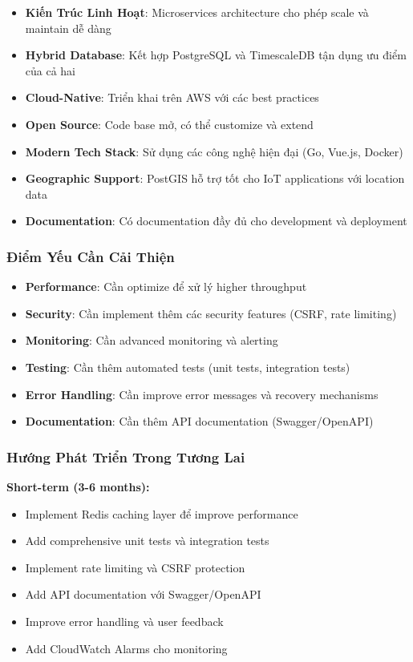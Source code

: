 \begin{itemize}
    \item \textbf{Kiến Trúc Linh Hoạt}: Microservices architecture cho phép scale và maintain dễ dàng
    \item \textbf{Hybrid Database}: Kết hợp PostgreSQL và TimescaleDB tận dụng ưu điểm của cả hai
    \item \textbf{Cloud-Native}: Triển khai trên AWS với các best practices
    \item \textbf{Open Source}: Code base mở, có thể customize và extend
    \item \textbf{Modern Tech Stack}: Sử dụng các công nghệ hiện đại (Go, Vue.js, Docker)
    \item \textbf{Geographic Support}: PostGIS hỗ trợ tốt cho IoT applications với location data
    \item \textbf{Documentation}: Có documentation đầy đủ cho development và deployment
\end{itemize}

\subsubsection{Điểm Yếu Cần Cải Thiện}

\begin{itemize}
    \item \textbf{Performance}: Cần optimize để xử lý higher throughput
    \item \textbf{Security}: Cần implement thêm các security features (CSRF, rate limiting)
    \item \textbf{Monitoring}: Cần advanced monitoring và alerting
    \item \textbf{Testing}: Cần thêm automated tests (unit tests, integration tests)
    \item \textbf{Error Handling}: Cần improve error messages và recovery mechanisms
    \item \textbf{Documentation}: Cần thêm API documentation (Swagger/OpenAPI)
\end{itemize}

\subsubsection{Hướng Phát Triển Trong Tương Lai}

\textbf{Short-term (3-6 months):}
\begin{itemize}
    \item Implement Redis caching layer để improve performance
    \item Add comprehensive unit tests và integration tests
    \item Implement rate limiting và CSRF protection
    \item Add API documentation với Swagger/OpenAPI
    \item Improve error handling và user feedback
    \item Add CloudWatch Alarms cho monitoring
\end{itemize}


